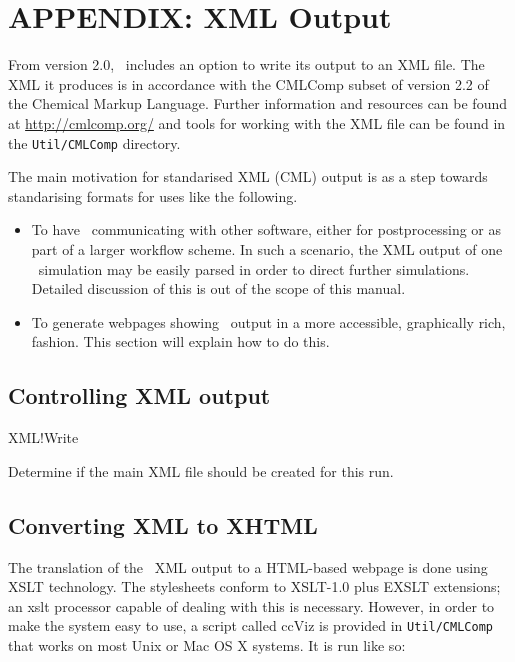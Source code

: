\newpage
\section{APPENDIX: XML Output}

From version 2.0, \siesta\ includes an option to write its output to an
XML file. The XML it produces is in accordance with the CMLComp subset of
version 2.2 of the Chemical Markup Language. Further information
and resources can be found at \url{http://cmlcomp.org/} and tools for working
with the XML file can be found in the \texttt{Util/CMLComp} directory.

The main motivation for standarised XML (CML) output is as a step
towards standarising formats for uses like the following.

\begin{itemize}

\item To have \siesta\ communicating with other software, either
for postprocessing or as part of a larger workflow scheme. In such a
scenario, the XML output of one \siesta\ simulation may be easily parsed
in order to direct further simulations. Detailed discussion of this is
out of the scope of this manual.

\item To generate webpages showing \siesta\ output in a more accessible,
graphically rich, fashion. This section will explain how to do this.

\end{itemize}

\subsection{Controlling XML output}

\begin{fdflogicalT}{XML!Write}

  Determine if the main XML file should be created for this run.
  
\end{fdflogicalT}

\subsection{Converting XML to XHTML}

The translation of the \siesta\ XML output to a HTML-based webpage is
done using XSLT technology. The stylesheets conform to XSLT-1.0 plus
EXSLT extensions; an xslt processor capable of dealing with this is
necessary. However, in order to make the system easy to use, a script
called ccViz is provided in \texttt{Util/CMLComp} that works on most Unix or
Mac OS X systems. It is run like so:

